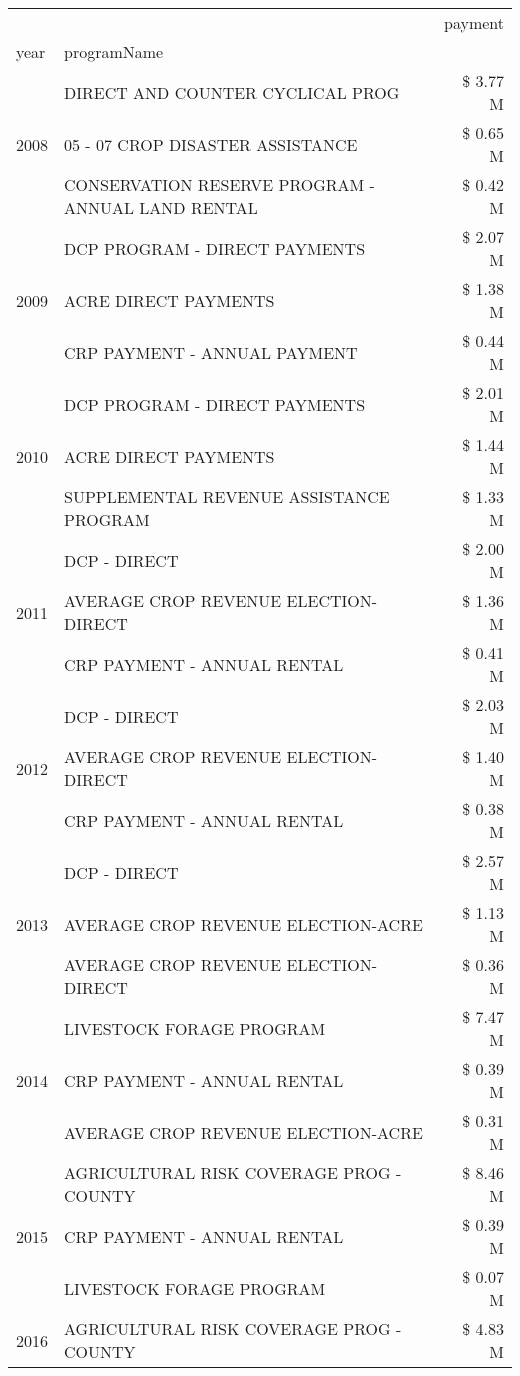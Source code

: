 \begin{tabular}{llr}
\toprule
 &  & payment \\
year & programName &  \\
\midrule
\multirow[t]{3}{*}{2008} & DIRECT AND COUNTER CYCLICAL PROG & \$ 3.77 M \\
 & 05 - 07 CROP DISASTER ASSISTANCE & \$ 0.65 M \\
 & CONSERVATION RESERVE PROGRAM - ANNUAL LAND RENTAL & \$ 0.42 M \\
\cline{1-3}
\multirow[t]{3}{*}{2009} & DCP PROGRAM - DIRECT PAYMENTS & \$ 2.07 M \\
 & ACRE DIRECT PAYMENTS & \$ 1.38 M \\
 & CRP PAYMENT - ANNUAL PAYMENT & \$ 0.44 M \\
\cline{1-3}
\multirow[t]{3}{*}{2010} & DCP PROGRAM - DIRECT PAYMENTS & \$ 2.01 M \\
 & ACRE DIRECT PAYMENTS & \$ 1.44 M \\
 & SUPPLEMENTAL REVENUE ASSISTANCE PROGRAM & \$ 1.33 M \\
\cline{1-3}
\multirow[t]{3}{*}{2011} & DCP - DIRECT & \$ 2.00 M \\
 & AVERAGE CROP REVENUE ELECTION-DIRECT & \$ 1.36 M \\
 & CRP PAYMENT - ANNUAL RENTAL & \$ 0.41 M \\
\cline{1-3}
\multirow[t]{3}{*}{2012} & DCP - DIRECT & \$ 2.03 M \\
 & AVERAGE CROP REVENUE ELECTION-DIRECT & \$ 1.40 M \\
 & CRP PAYMENT - ANNUAL RENTAL & \$ 0.38 M \\
\cline{1-3}
\multirow[t]{3}{*}{2013} & DCP - DIRECT & \$ 2.57 M \\
 & AVERAGE CROP REVENUE ELECTION-ACRE & \$ 1.13 M \\
 & AVERAGE CROP REVENUE ELECTION-DIRECT & \$ 0.36 M \\
\cline{1-3}
\multirow[t]{3}{*}{2014} & LIVESTOCK FORAGE PROGRAM & \$ 7.47 M \\
 & CRP PAYMENT - ANNUAL RENTAL & \$ 0.39 M \\
 & AVERAGE CROP REVENUE ELECTION-ACRE & \$ 0.31 M \\
\cline{1-3}
\multirow[t]{3}{*}{2015} & AGRICULTURAL RISK COVERAGE PROG - COUNTY & \$ 8.46 M \\
 & CRP PAYMENT - ANNUAL RENTAL & \$ 0.39 M \\
 & LIVESTOCK FORAGE PROGRAM & \$ 0.07 M \\
\cline{1-3}
\multirow[t]{3}{*}{2016} & AGRICULTURAL RISK COVERAGE PROG - COUNTY & \$ 4.83 M \\

\end{tabular}
